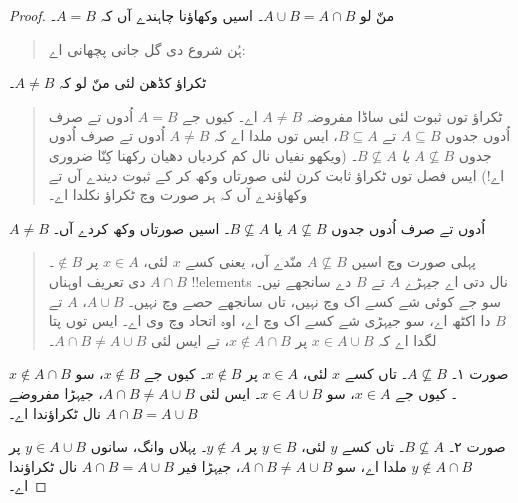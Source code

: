 \documentclass[../../../include/open-logic-section]{subfiles}
\begin{document}
\begin{proof}
  منّ لو $A \cup B = A \cap B$۔ اسیں وکھاؤنا چاہندے آں کہ $A = B$۔
  \begin{quote}
    ہُن شروع دی گل جانی پچھانی اے:
  \end{quote}
  ٹکراؤ کڈھن لئی منّ لو کہ $A \neq B$۔
  \begin{quote}
    ٹکراؤ توں ثبوت لئی ساڈا مفروضہ $A \neq
    B$ اے۔ کیوں جے $A = B$ اُدوں تے صرف اُدوں جدوں $A \subseteq B$ تے $B \subseteq A$، ایس توں ملدا اے کہ $A \neq B$ اُدوں تے صرف اُدوں جدوں $A \nsubseteq B$ \emph{یا} $B \nsubseteq
    A$۔ (ویکھو نفیاں نال کم کردیاں دھیان رکھنا کِنّا ضروری اے!{}) ایس فصل توں ٹکراؤ ثابت کرن لئی صورتاں وکھ کر کے ثبوت دیندے آں تے وکھاؤندے آں کہ ہر صورت وچ ٹکراؤ نکلدا اے۔
  \end{quote}
  $A \neq B$ اُدوں تے صرف اُدوں جدوں $A \nsubseteq B$ یا $B \nsubseteq A$۔ اسیں صورتاں وکھ کردے آں۔
  \begin{quote}
    پہلی صورت وچ اسیں $A \nsubseteq B$ منّدے آں، یعنی کسے $x$ لئی، $x \in A$ پر $\notin B$۔ $A \cap B$ دی تعریف اوہناں !!{element}s نال دتی اے جیہڑے $A$ تے $B$ دے سانجھے نیں۔ سو جے کوئی شے کسے اک وچ نہیں، تاں سانجھے حصے وچ نہیں۔ $A \cup B$، $A$ تے $B$ دا اکٹھ اے، سو جیہڑی شے کسے اک وچ اے، اوہ اتحاد وچ وی اے۔ ایس توں پتا لگدا اے کہ $x \in A \cup B$ پر $x \notin A \cap
    B$، تے ایس لئی $A \cap B \neq A \cup B$۔
  \end{quote}

  صورت ۱۔ $A \nsubseteq B$۔ تاں کسے $x$ لئی، $x \in A$ پر $x \notin
  B$۔ کیوں جے $x \notin B$، سو $x \notin A \cap B$۔ کیوں جے $x \in A$، سو $x \in A \cup B$۔ ایس لئی $A \cap B \neq A \cup B$، جیہڑا مفروضے $A \cap B = A \cup B$ نال ٹکراؤندا اے۔

  صورت ۲۔ $B \nsubseteq A$۔ تاں کسے $y$ لئی، $y \in B$ پر $y \notin
  A$۔ پہلاں وانگ، سانوں $y \in A \cup B$ پر $y \notin A \cap B$ ملدا اے، سو $A \cap B \neq A \cup B$، جیہڑا فیر $A \cap B = A \cup
  B$ نال ٹکراؤندا اے۔
\end{proof}
\end{document}
